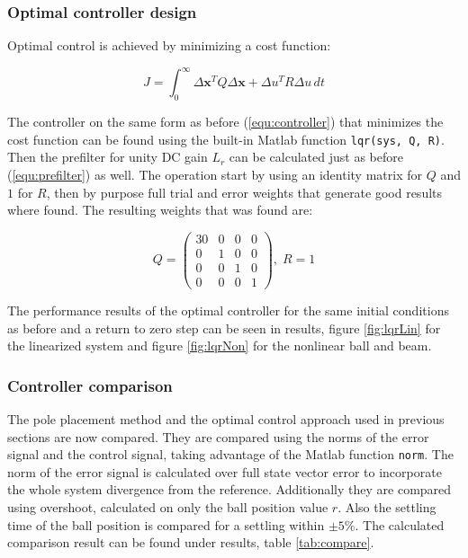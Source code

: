 \documentclass[a4paper, titlepage]{article}
\begin{document}
\subsubsection{Optimal controller design}
Optimal control is achieved by minimizing a cost function:

\begin{equation}
J = \int_0^{\infty} \Delta \textbf{x}^TQ\Delta \textbf{x} + \Delta u^TR\Delta u\,dt
\end{equation}

The controller on the same form as before (\ref{equ:controller}) that minimizes the cost function can be found using the built-in Matlab function \verb|lqr(sys, Q, R)|.
Then the prefilter for unity DC gain $L_r$ can be calculated just as before (\ref{equ:prefilter}) as well.
The operation start by using an identity matrix for $Q$ and $1$ for $R$, then by purpose full trial and error weights that generate good results where found.
The resulting weights that was found are:

\begin{equation}
Q = \begin{pmatrix}
30 & 0 & 0 & 0 \\
0 & 1 & 0 & 0 \\
0 & 0 & 1 & 0 \\
0 & 0 & 0 & 1
\end{pmatrix}, \; 
R = 1
\end{equation}

The performance results of the optimal controller for the same initial conditions as before and a return to zero step can be seen in results, figure \ref{fig:lqrLin} for the linearized system and figure \ref{fig:lqrNon} for the nonlinear ball and beam.

\subsubsection{Controller comparison}
The pole placement method and the optimal control approach used in previous sections are now compared.
They are compared using the norms of the error signal and the control signal, taking advantage of the Matlab function \verb|norm|.
The norm of the error signal is calculated over full state vector error to incorporate the whole system divergence from the reference.
Additionally they are compared using overshoot, calculated on only the ball position value $r$.
Also the settling time of the ball position is compared for a settling within $\pm5\%$.
The calculated comparison result can be found under results, table \ref{tab:compare}.
\end{document}
